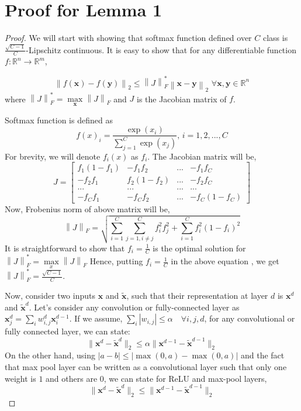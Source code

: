 \documentclass{article} %
\begin{document}
\section{Proof for Lemma 1}
\begin{proof}
We will start with showing that softmax function defined over $C$ class is $\frac{\sqrt{C-1}}{C}$-Lipschitz continuous. It is easy to show that for any differentiable function \mbox{$f:\mathbb{R}^n\rightarrow\mathbb{R}^m$},

\[
\left \| f(\mathbf{x})-f(\mathbf{y})\right \|_2 \leq \left \|J\right \|^*_F  \left\| \mathbf{x}-\mathbf{y}\right\|_2  \, \, \forall \mathbf{x},\mathbf{y}\in\mathbb{R}^n
\]
where $\left \|J\right \|^*_F = \max\limits_{\mathbf{x}} \left \|J\right \|_F$ and $J$ is the Jacobian matrix of $f$.

Softmax function is defined as
\[
f(x)_i = \frac{\exp(x_i)}{\sum\limits_{j=1}^{C}\exp(x_j)}, \, i={1,2,...,C}
\]
For brevity, we will denote $f_i(x)$ as $f_i$. The Jacobian matrix will be,
\[
J = \begin{bmatrix} f_1(1-f_1) & -f_1f_2  & ... & -f_1f_C \\
-f_2f_1 & f_2(1-f_2)  & ...  & -f_2f_C \\
... & ... & ... & ...  \\
-f_{C}f_{1} & -f_{C}f_{2}  & ...  & -f_{C}(1-f_{C})
\end{bmatrix}
\]
Now, Frobenius norm of above matrix will be,
\[
\left \| J \right \|_F = \sqrt{\sum\limits_{i=1}^{C}\sum\limits_{j=1, i\neq j}^{C}f_{i}^{2}f_{j}^{2} + \sum\limits_{i=1}^{C} f_i^2(1-f_i)^2}
\]
It is straightforward to show that $f_i = \frac{1}{C}$ is the optimal solution for $\left \| J \right \|^{*}_F = \max\limits_{x}\left \| J \right \|_F $ Hence, putting $f_i = \frac{1}{C}$ in the above equation , we get \mbox{$\left \| J \right \|^{*}_F = \frac{\sqrt{C-1}}{C}$}.

Now, consider two inputs $\mathbf{x}$ and $\mathbf{\tilde{x}}$, such that their representation at layer $d$ is $\mathbf{x}^d$ and $\mathbf{\tilde{x}}^d$. Let's consider any convolution or fully-connected layer as $\mathbf{x}^d_j = \sum_i w_{i,j}^d \mathbf{x}^{d-1}_i$. If we assume, \mbox{$\sum_i |w_{i,j}| \leq \alpha \quad \forall i,j,d$}, for any convolutional or fully connected layer, we can state:
\[
\|\mathbf{x}^d - \mathbf{\tilde{x}}^d\|_2 \leq  \alpha \|\mathbf{x}^{d-1} - \mathbf{\tilde{x}}^{d-1}\|_2
\] 
On the other hand, using $|a-b| \leq |\max(0, a) - \max(0,a)|$ and the fact that max pool layer can be written as a convolutional layer such that only one weight is $1$ and others are $0$, we can state for ReLU and max-pool layers,
\[
\|\mathbf{x}^d - \mathbf{\tilde{x}}^d\|_2 \leq  \|\mathbf{x}^{d-1} - \mathbf{\tilde{x}}^{d-1}\|_2
\] 


\end{proof}
\end{document}
